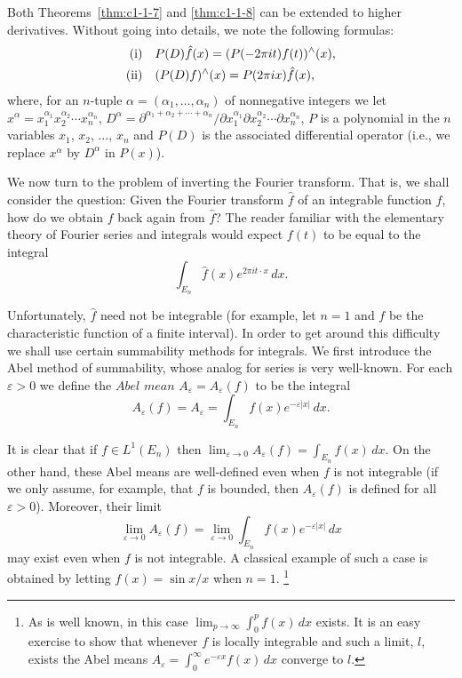 Both Theorems~\ref{thm:c1-1-7} and \ref{thm:c1-1-8} can be extended to higher
derivatives. Without going into details, we note the following formulas:
\begin{equation}\label{eq:c1-1-9}
\begin{aligned}
\textup{(i)}\quad &P(D)\hat{f}(x)=(P(-2\pi i t)f(t))^{\wedge}(x),\\
\textup{(ii)}\quad &(P(D)f)^{\wedge}(x)=P(2\pi i x)\hat{f}(x),
\end{aligned}
\end{equation}
where, for an $n$-tuple $\alpha = (\alpha_{1}, \ldots, \alpha_{n})$ of
nonnegative integers we let
$x^{\alpha} = x_{1}^{\alpha_{1}} x_{2}^{\alpha_{2}} \cdots x_{n}^{\alpha_{n}}$,
$D^{\alpha} = \partial^{\alpha_{1} + \alpha_{2} + \cdots + \alpha_{n}} / \partial x_{1}^{\alpha_{1}} \partial x_{2}^{\alpha_{2}} \cdots \partial x_{n}^{\alpha_{n}}$,
$P$ is a polynomial in the $n$ variables $x_{1}$, $x_{2}$, $\ldots$, $x_{n}$
and $P(D)$ is the associated differential operator (i.e., we replace $x^{\alpha}$
by $D^{\alpha}$ in $P(x)$).

We now turn to the problem of inverting the Fourier transform. That is, we
shall consider the question: Given the Fourier transform $\hat{f}$ of an
integrable function $f$, how do we obtain $f$ back again from $\hat{f}$? The
reader familiar with the elementary theory of Fourier series and integrals would
expect $f(t)$ to be equal to the integral
\begin{equation}\label{eq:c1-1-10}
\int_{E_{n}}\hat{f}(x)e^{2\pi i t\cdot x}\,dx.
\end{equation}

Unfortunately, $\hat{f}$ need not be integrable (for example, let $n = 1$ and
$f$ be the characteristic function of a finite interval). In order to get around
this difficulty we shall use certain summability methods for integrals. We first
introduce the Abel method of summability, whose analog for series is very
well-known. For each $\varepsilon > 0$ we define the $Abel$ $mean$
$A_{\varepsilon} = A_{\varepsilon}(f)$ to be the integral
\[
A_{\varepsilon}(f)=A_{\varepsilon}=\int_{E_{n}}f(x)e^{-\varepsilon|x|}\,dx.
\]

It is clear that if $f \in L^{1}(E_{n})$ then
$\lim_{\varepsilon \to 0} A_{\varepsilon}(f) = \int_{E_{n}} f(x) \, dx$. On the
other hand, these Abel means are well-defined even when $f$ is not integrable
(if we only assume, for example, that $f$ is bounded, then
$A_{\varepsilon}(f)$ is defined for all $\varepsilon > 0$). Moreover, their
limit
\begin{equation}\label{eq:c1-1-11}
\lim_{\varepsilon\to0}A_{\varepsilon}(f)
=\lim_{\varepsilon\to0}\int_{E_{n}}f(x)e^{-\varepsilon|x|}\,dx
\end{equation}
may exist even when $f$ is not integrable. A classical example of such a case is
obtained by letting $f(x) = \sin x/x$ when $n = 1$.%
\footnote{As is well known, in this case
$\lim_{p\to\infty}\int_{0}^{p}f(x)\,dx$ exists. It is an easy exercise to show
that whenever $f$ is locally integrable and such a limit, $l$, exists the Abel
means $A_{\varepsilon}=\int_{0}^{\infty}e^{-\varepsilon x}f(x)\,dx$ converge to
$l$.}

